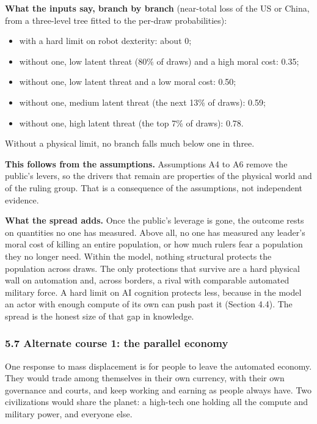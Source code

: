 \documentclass[
  10pt,
]{article}
\providecommand{\tightlist}{%
  \setlength{\itemsep}{0pt}\setlength{\parskip}{0pt}}
\begin{document}
\textbf{What the inputs say, branch by branch} (near-total loss of the US or China, from a
three-level tree fitted to the per-draw probabilities):

\begin{itemize}
\tightlist
\item
  with a hard limit on robot dexterity: about 0;
\item
  without one, low latent threat (80\% of draws) and a high moral cost: 0.35;
\item
  without one, low latent threat and a low moral cost: 0.50;
\item
  without one, medium latent threat (the next 13\% of draws): 0.59;
\item
  without one, high latent threat (the top 7\% of draws): 0.78.
\end{itemize}

Without a physical limit, no branch falls much below one in three.

\textbf{This follows from the assumptions.} Assumptions A4 to A6 remove the public's levers, so the
drivers that remain are properties of the physical world and of the ruling group. That is a
consequence of the assumptions, not independent evidence.

\textbf{What the spread adds.} Once the public's leverage is gone, the outcome rests on quantities
no one has measured. Above all, no one has measured any leader's moral cost of killing an entire
population, or how much rulers fear a population they no longer need. Within the model, nothing
structural protects the population across draws. The only protections that survive are a hard
physical wall on automation and, across borders, a rival with comparable automated military force. A
hard limit on AI cognition protects less, because in the model an actor with enough compute of its
own can push past it (Section 4.4). The spread is the honest size of that gap in knowledge.

\subsubsection{5.7 Alternate course 1: the parallel
economy}\label{alternate-course-1-the-parallel-economy}

One response to mass displacement is for people to leave the automated economy. They would trade
among themselves in their own currency, with their own governance and courts, and keep working and
earning as people always have. Two civilizations would share the planet: a high-tech one holding all
the compute and military power, and everyone else.
\end{document}
